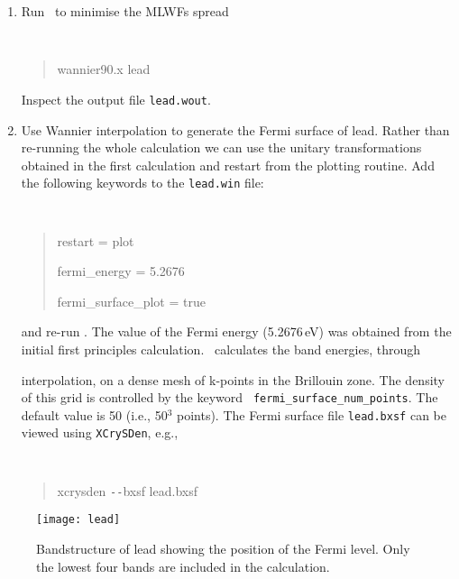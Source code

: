 \documentclass[a4paper,11pt,twoside]{article}
\begin{document}
\begin{enumerate}
\item Run \wannier\ to minimise the MLWFs spread
{\tt
\begin{quote}
wannier90.x lead
\end{quote} }
Inspect the output file {\tt lead.wout}.
\item Use Wannier interpolation to generate the Fermi surface of
  lead. Rather than re-running the whole calculation we can use the
  unitary transformations obtained in the first calculation and
  restart from the plotting routine. Add the following keywords to the
  {\tt lead.win} file: {\tt
\begin{quote}
restart = plot

fermi\_energy = 5.2676

fermi\_surface\_plot = true
\end{quote} } and re-run \wannier. The value of the Fermi energy
(5.2676\,eV) was obtained from the initial first principles
calculation. \wannier\ calculates the band energies, through 

interpolation, on a dense mesh of k-points in the Brillouin zone. The
density of this grid is controlled by the keyword {\tt
  fermi\_surface\_num\_points}. The default value is 50 (i.e., 50$^3$
points).  The Fermi surface file {\tt lead.bxsf} can be viewed using
{\tt XCrySDen}, e.g., 
%
{\tt
\begin{quote}
xcrysden \texttt{-{}-}bxsf lead.bxsf
\end{quote} }
\end{enumerate}

\begin{figure}[h]
\begin{center}
\texttt{[image: lead]}
\caption{Bandstructure of lead showing the position of the Fermi
  level. Only the lowest four bands are included in the calculation.} 
\label{fig:pb-bnd}
\end{center}
\end{figure}



\end{document}
